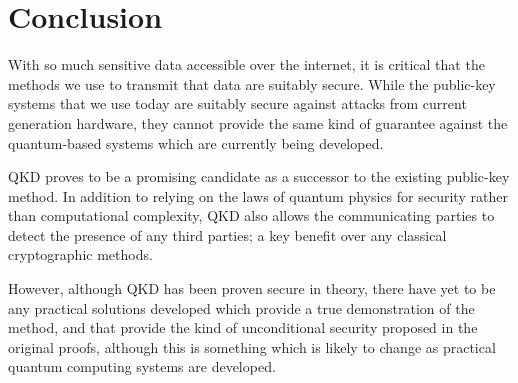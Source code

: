 \documentclass[runningheads,a4paper]{llncs}
\begin{document}
\section{Conclusion}

With so much sensitive data accessible over the internet, it is critical that the methods we use to transmit that data are suitably secure. While the public-key systems that we use today are suitably secure against attacks from current generation hardware, they cannot provide the same kind of guarantee against the quantum-based systems which are currently being developed.

QKD proves to be a promising candidate as a successor to the existing public-key method. In addition to relying on the laws of quantum physics for security rather than computational complexity, QKD also allows the communicating parties to detect the presence of any third parties; a key benefit over any classical cryptographic methods.

However, although QKD has been proven secure in theory, there have yet to be any practical solutions developed which provide a true demonstration of the method, and that provide the kind of unconditional security proposed in the original proofs, although this is something which is likely to change as practical quantum computing systems are developed.



\end{document}
